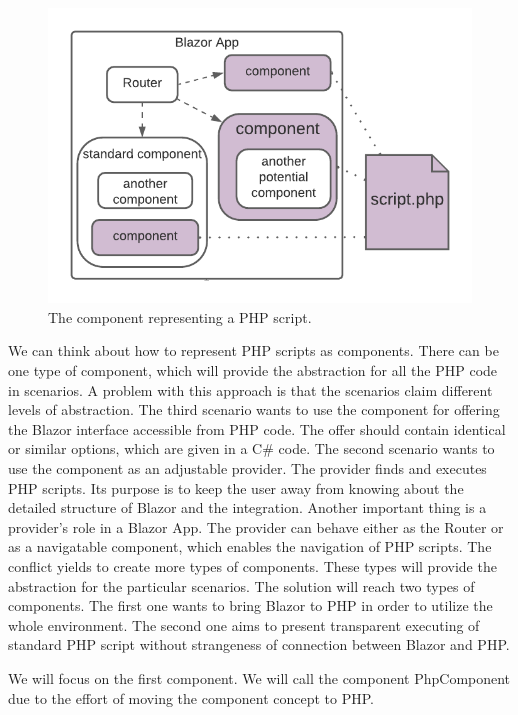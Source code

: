 \par
\begin{figure}[H]\centering
\includegraphics{./img/component}
\caption{The component representing a PHP script.}
\label{img02:component}
\end{figure} 
\par
We can think about how to represent PHP scripts as components.
There can be one type of component, which will provide the abstraction for all the PHP code in scenarios.
A problem with this approach is that the scenarios claim different levels of abstraction.
The third scenario wants to use the component for offering the Blazor interface accessible from PHP code.
The offer should contain identical or similar options, which are given in a C\# code.
The second scenario wants to use the component as an adjustable provider.
The provider finds and executes PHP scripts.
Its purpose is to keep the user away from knowing about the detailed structure of Blazor and the integration.
Another important thing is a provider's role in a Blazor App.
The provider can behave either as the Router or as a navigatable component, which enables the navigation of PHP scripts.
The conflict yields to create more types of components.
These types will provide the abstraction for the particular scenarios.
The solution will reach two types of components.
The first one wants to bring Blazor to PHP in order to utilize the whole environment.
The second one aims to present transparent executing of standard PHP script without strangeness of connection between Blazor and PHP.
\par
We will focus on the first component.
We will call the component PhpComponent due to the effort of moving the component concept to PHP.
